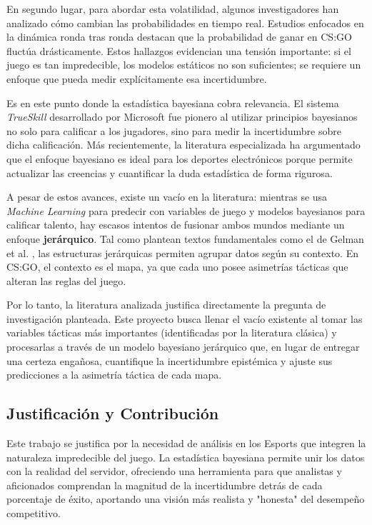 \documentclass[twocolumn,10pt]{article}
\begin{document}
En segundo lugar, para abordar esta volatilidad, algunos investigadores han analizado cómo cambian las probabilidades en tiempo real. Estudios enfocados en la dinámica ronda tras ronda \cite{hodge2019win, xenopoulos2022csgo} destacan que la probabilidad de ganar en CS:GO fluctúa drásticamente. Estos hallazgos evidencian una tensión importante: si el juego es tan impredecible, los modelos estáticos no son suficientes; se requiere un enfoque que pueda medir explícitamente esa incertidumbre.

Es en este punto donde la estadística bayesiana cobra relevancia. El sistema \textit{TrueSkill} desarrollado por Microsoft \cite{herbrich2006trueskill} fue pionero al utilizar principios bayesianos no solo para calificar a los jugadores, sino para medir la incertidumbre sobre dicha calificación. Más recientemente, la literatura especializada \cite{sainz2024bayesian, goldin2021bayesian} ha argumentado que el enfoque bayesiano es ideal para los deportes electrónicos porque permite actualizar las creencias y cuantificar la duda estadística de forma rigurosa.

A pesar de estos avances, existe un vacío en la literatura: mientras se usa \textit{Machine Learning} para predecir con variables de juego y modelos bayesianos para calificar talento, hay escasos intentos de fusionar ambos mundos mediante un enfoque \textbf{jerárquico}. Tal como plantean textos fundamentales como el de Gelman et al. \cite{gelman2013bayesian}, las estructuras jerárquicas permiten agrupar datos según su contexto. En CS:GO, el contexto es el mapa, ya que cada uno posee asimetrías tácticas que alteran las reglas del juego.

Por lo tanto, la literatura analizada justifica directamente la pregunta de investigación planteada. Este proyecto busca llenar el vacío existente al tomar las variables tácticas más importantes (identificadas por la literatura clásica) y procesarlas a través de un modelo bayesiano jerárquico que, en lugar de entregar una certeza engañosa, cuantifique la incertidumbre epistémica y ajuste sus predicciones a la asimetría táctica de cada mapa.

\subsection{Justificación y Contribución}
Este trabajo se justifica por la necesidad de análisis en los Esports que integren la naturaleza impredecible del juego. La estadística bayesiana permite unir los datos con la realidad del servidor, ofreciendo una herramienta para que analistas y aficionados comprendan la magnitud de la incertidumbre detrás de cada porcentaje de éxito, aportando una visión más realista y "honesta" del desempeño competitivo.
\end{document}
